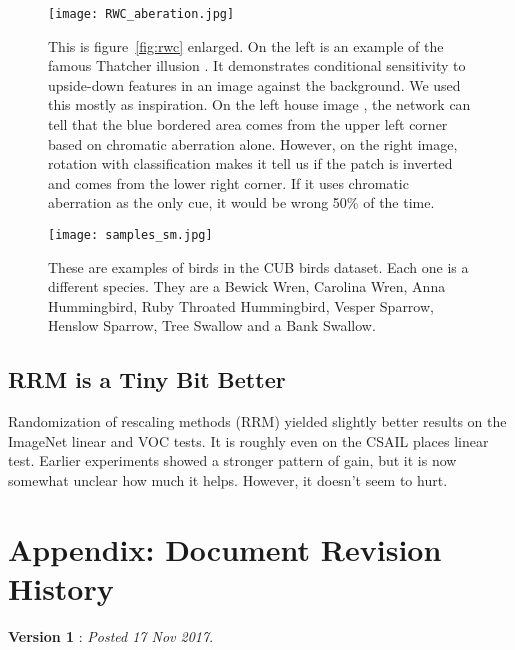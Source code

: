 \documentclass[10pt,twocolumn,letterpaper]{article}
\begin{document}
\begin{figure*}
\centering
\texttt{[image: RWC\_aberation.jpg]}
\caption{This is figure~\ref{fig:rwc} enlarged. On the left is an example of the famous Thatcher illusion \cite{Thompson80,MTeffect06}. It demonstrates conditional sensitivity to upside-down features in an image against the background. We used this mostly as inspiration. On the left house image \cite{ChromaHouse}, the network can tell that the blue bordered area comes from the upper left corner based on chromatic aberration alone. However, on the right image, rotation with classification makes it tell us if the patch is inverted and comes from the lower right corner. If it uses chromatic aberration as the only cue, it would be wrong 50\% of the time.}
\label{fig:rwc_big}
\end{figure*}
\begin{figure*}
\centering
\texttt{[image: samples\_sm.jpg]}
\caption{These are examples of birds in the CUB birds dataset. Each one is a different species. They are a Bewick Wren, Carolina Wren, Anna Hummingbird, Ruby Throated Hummingbird, Vesper Sparrow, Henslow Sparrow, Tree Swallow and a Bank Swallow.}
\label{fig:birds}
\end{figure*}
\subsection{RRM is a Tiny Bit Better}

Randomization of rescaling methods (RRM) yielded slightly better results on the ImageNet linear and VOC tests. It is roughly even on the CSAIL places linear test. Earlier experiments showed a stronger pattern of gain, but it is now somewhat unclear how much it helps. However, it doesn't seem to hurt. 

\section{Appendix: Document Revision History} \label{revision_appendix}{\bf Version 1} : \emph{Posted 17 Nov 2017}.
\end{document}
